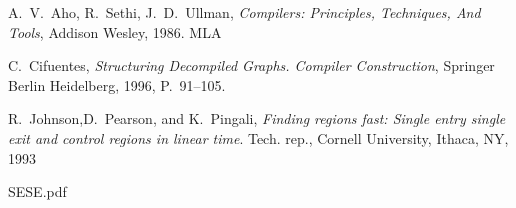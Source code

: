 \documentclass[conference]{IEEEtran}
\begin{document}
\begin{thebibliography}{9}
 A.~V.~Aho, R.~Sethi, J.~D.~Ullman, \emph{Compilers: Principles, Techniques, And Tools}, Addison Wesley, 1986.  MLA

 C.~Cifuentes, \emph{Structuring Decompiled Graphs. Compiler Construction}, Springer Berlin Heidelberg, 1996, P.~91--105.

 R.~Johnson,D.~Pearson, and K.~Pingali, \emph{Finding regions fast: Single entry single exit and control regions in linear time}. Tech. rep., Cornell University, Ithaca, NY, 1993

 SESE.pdf

\end{thebibliography}




\end{document}
